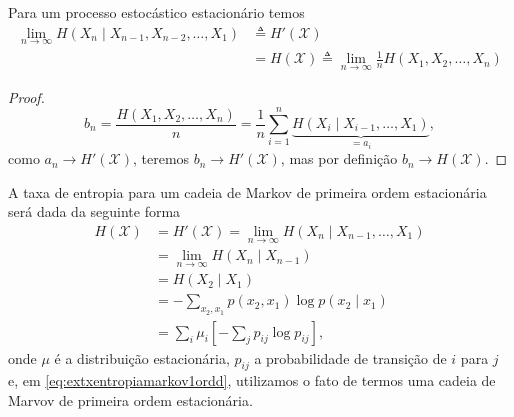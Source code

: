 \begin{theorem}
  Para um processo estocástico estacionário temos
  \begin{subequations}
  \begin{align}
    \lim_{n \rightarrow \infty} H(X_n \mid X_{n-1}, X_{n-2}, \ldots, X_1) &\triangleq H'(\mathcal{X}) \\
                                                                          &= H(\mathcal{X}) \triangleq \lim_{n \rightarrow \infty} \frac{1}{n} H(X_1,X_2,\ldots,X_n)
  \end{align}
  \end{subequations}
\end{theorem}

\begin{proof}
  \begin{equation}
        b_n = \frac{H(X_1,X_2,\ldots,X_n)}{n} = \frac{1}{n} \sum_{i=1}^n \underbrace{H(X_i \mid X_{i-1}, \ldots, X_1)}_{=a_i} ,
  \end{equation}
  como $a_n \rightarrow H'(\mathcal{X})$, teremos $b_n \rightarrow H'(\mathcal{X})$, mas por definição $b_n \rightarrow H(\mathcal{X})$.
\end{proof}



\begin{example}
  A taxa de entropia para um cadeia de Markov de primeira ordem estacionária será dada da seguinte forma
  \begin{subequations}\label{eq:extxentropiamarkov1ord}
  \begin{align}
  H(\mathcal{X}) &= H'(\mathcal{X}) = \lim_{n \rightarrow \infty} H(X_n \mid X_{n-1}, \ldots, X_1) \\
        &= \lim_{n \rightarrow \infty} H(X_n \mid X_{n-1}) \\
        &= H(X_2 \mid X_1) \label{eq:extxentropiamarkov1ordd}\\
        &= - \sum_{x_2, x_1} p(x_2, x_1) \log p(x_2 \mid x_1) \\
        &= \sum_i \mu_i \left[ - \sum_j p_{ij} \log p_{ij} \right] ,
  \end{align}
  \end{subequations}
  onde $\mu$ é a distribuição estacionária, $p_{ij}$ a probabilidade de transição de $i$ para $j$ e,
  em \ref{eq:extxentropiamarkov1ordd}, utilizamos o fato de termos uma cadeia de Marvov de primeira ordem estacionária.
\end{example}

